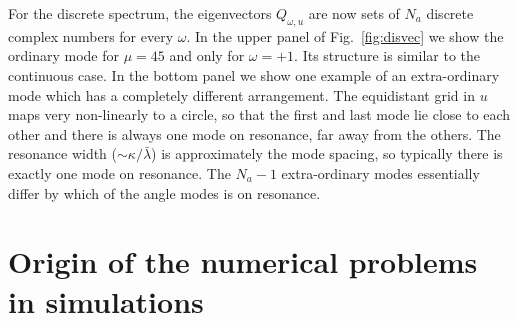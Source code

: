 \documentclass[twocolumn,prd,showpacs,
floatfix,preprintnumbers,nofootinbib]{revtex4}
\begin{document}
For the discrete spectrum, the eigenvectors $Q_{\omega,u}$ are now sets of $N_a$ discrete complex numbers for every $\omega$.
In the upper panel of Fig.~\ref{fig:disvec} we show the ordinary mode for $\mu=45$ and
only for $\omega=+1$. Its structure is similar to the continuous
case. In the bottom panel we show one example of an extra-ordinary
mode which has a completely different arrangement. 
The equidistant grid in $u$ maps very non-linearly to a circle, so that the first and last mode lie close to each other and there is always one mode on resonance, far away from the others. The resonance
width ($\sim \kappa/\bar\lambda$) is approximately the mode spacing, so typically there is
exactly one mode on resonance. The $N_a-1$ extra-ordinary modes
essentially differ by which of the angle modes is on resonance.


\section{Origin of the numerical problems in simulations}
\label{sec:simulations}
\end{document}
